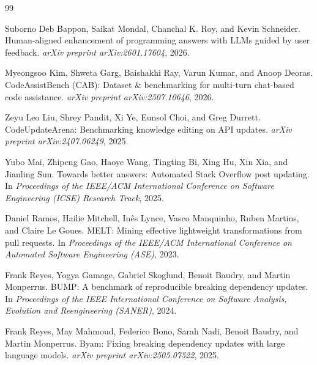\documentclass{article}
\begin{document}
\begin{thebibliography}{99}

Suborno Deb Bappon, Saikat Mondal, Chanchal K. Roy, and Kevin Schneider.
\newblock Human-aligned enhancement of programming answers with LLMs guided by user feedback.
\newblock \emph{arXiv preprint arXiv:2601.17604}, 2026.

Myeongsoo Kim, Shweta Garg, Baishakhi Ray, Varun Kumar, and Anoop Deoras.
\newblock CodeAssistBench (CAB): Dataset \& benchmarking for multi-turn chat-based code assistance.
\newblock \emph{arXiv preprint arXiv:2507.10646}, 2026.

Zeyu Leo Liu, Shrey Pandit, Xi Ye, Eunsol Choi, and Greg Durrett.
\newblock CodeUpdateArena: Benchmarking knowledge editing on API updates.
\newblock \emph{arXiv preprint arXiv:2407.06249}, 2025.

Yubo Mai, Zhipeng Gao, Haoye Wang, Tingting Bi, Xing Hu, Xin Xia, and Jianling Sun.
\newblock Towards better answers: Automated Stack Overflow post updating.
\newblock In \emph{Proceedings of the IEEE/ACM International Conference on Software Engineering (ICSE) Research Track}, 2025.

Daniel Ramos, Hailie Mitchell, In{\^e}s Lynce, Vasco Manquinho, Ruben Martins, and Claire Le Goues.
\newblock MELT: Mining effective lightweight transformations from pull requests.
\newblock In \emph{Proceedings of the IEEE/ACM International Conference on Automated Software Engineering (ASE)}, 2023.

Frank Reyes, Yogya Gamage, Gabriel Skoglund, Benoit Baudry, and Martin Monperrus.
\newblock BUMP: A benchmark of reproducible breaking dependency updates.
\newblock In \emph{Proceedings of the IEEE International Conference on Software Analysis, Evolution and Reengineering (SANER)}, 2024.

Frank Reyes, May Mahmoud, Federico Bono, Sarah Nadi, Benoit Baudry, and Martin Monperrus.
\newblock Byam: Fixing breaking dependency updates with large language models.
\newblock \emph{arXiv preprint arXiv:2505.07522}, 2025.


\end{thebibliography}
\end{document}
